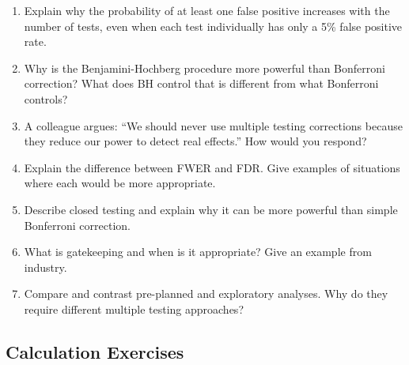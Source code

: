 \begin{enumerate}
    \item Explain why the probability of at least one false positive increases with the number of tests, even when each test individually has only a 5\% false positive rate.

    \item Why is the Benjamini-Hochberg procedure more powerful than Bonferroni correction? What does BH control that is different from what Bonferroni controls?

    \item A colleague argues: ``We should never use multiple testing corrections because they reduce our power to detect real effects.'' How would you respond?

    \item Explain the difference between FWER and FDR. Give examples of situations where each would be more appropriate.

    \item Describe closed testing and explain why it can be more powerful than simple Bonferroni correction.

    \item What is gatekeeping and when is it appropriate? Give an example from industry.

    \item Compare and contrast pre-planned and exploratory analyses. Why do they require different multiple testing approaches?
\end{enumerate}

\subsection{Calculation Exercises}

